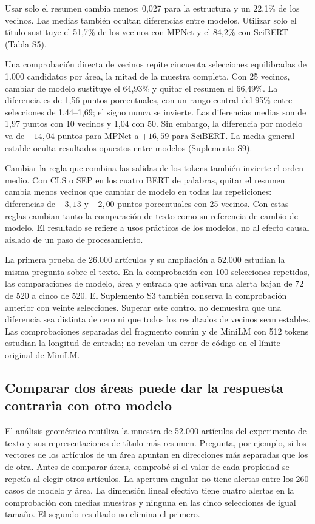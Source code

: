 \documentclass[12pt]{article}
\begin{document}
Usar solo el resumen cambia menos: 0,027 para la estructura y un 22,1\% de los vecinos. Las medias también ocultan diferencias entre modelos. Utilizar solo el título sustituye el 51,7\% de los vecinos con MPNet y el 84,2\% con SciBERT (Tabla S5).

Una comprobación directa de vecinos repite cincuenta selecciones equilibradas de 1.000 candidatos por área, la mitad de la muestra completa. Con 25 vecinos, cambiar de modelo sustituye el 64,93\% y quitar el resumen el 66,49\%. La diferencia es de 1,56 puntos porcentuales, con un rango central del 95\% entre selecciones de 1,44--1,69; el signo nunca se invierte. Las diferencias medias son de 1,97 puntos con 10 vecinos y 1,04 con 50. Sin embargo, la diferencia por modelo va de $-14,04$ puntos para MPNet a $+16,59$ para SciBERT. La media general estable oculta resultados opuestos entre modelos (Suplemento S9).

Cambiar la regla que combina las salidas de los tokens también invierte el orden medio. Con CLS o SEP en los cuatro BERT de palabras, quitar el resumen cambia menos vecinos que cambiar de modelo en todas las repeticiones: diferencias de $-3,13$ y $-2,00$ puntos porcentuales con 25 vecinos. Con estas reglas cambian tanto la comparación de texto como su referencia de cambio de modelo. El resultado se refiere a usos prácticos de los modelos, no al efecto causal aislado de un paso de procesamiento.

La primera prueba de 26.000 artículos y su ampliación a 52.000 estudian la misma pregunta sobre el texto. En la comprobación con 100 selecciones repetidas, las comparaciones de modelo, área y entrada que activan una alerta bajan de 72 de 520 a cinco de 520. El Suplemento S3 también conserva la comprobación anterior con veinte selecciones. Superar este control no demuestra que una diferencia sea distinta de cero ni que todos los resultados de vecinos sean estables. Las comprobaciones separadas del fragmento común y de MiniLM con 512 tokens estudian la longitud de entrada; no revelan un error de código en el límite original de MiniLM.

\FloatBarrier
\subsection{Comparar dos áreas puede dar la respuesta contraria con otro modelo}
El análisis geométrico reutiliza la muestra de 52.000 artículos del experimento de texto y sus representaciones de título más resumen. Pregunta, por ejemplo, si los vectores de los artículos de un área apuntan en direcciones más separadas que los de otra. Antes de comparar áreas, comprobé si el valor de cada propiedad se repetía al elegir otros artículos. La apertura angular no tiene alertas entre los 260 casos de modelo y área. La dimensión lineal efectiva tiene cuatro alertas en la comprobación con medias muestras y ninguna en las cinco selecciones de igual tamaño. El segundo resultado no elimina el primero.
\end{document}
